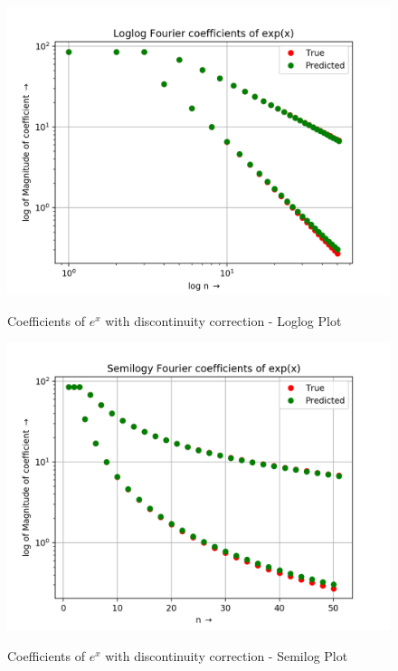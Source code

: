 \documentclass[11pt, a4paper]{article}
\begin{document}
\begin{figure}[H]
   	\centering
   	\includegraphics[scale=0.5]{loglog1p.png}
   	\label{fig:loglog1p}
   	\caption{Coefficients of $e^{x}$ with discontinuity correction - Loglog Plot}
\end{figure}
\begin{figure}[H]
   	\centering
   	\includegraphics[scale=0.5]{semilog1p.png}
   	\label{fig:semilog1p}
   	\caption{Coefficients of $e^{x}$ with discontinuity correction - Semilog Plot}
\end{figure}
\end{document}
